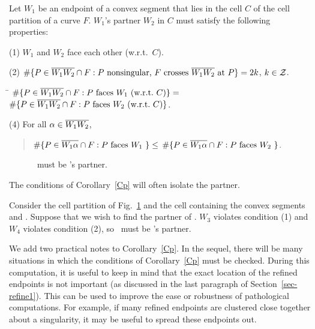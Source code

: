 \begin{corollary}
\label{Cp}
Let $W_{1}$ be an endpoint of a convex segment that lies in the cell $C$ 
of the cell partition of a curve $F$.
$W_{1}$'s partner $W_{2}$ in $C$ must satisfy the following properties:

{\rm (1)} $W_{1}$ and $W_{2}$ face each other {\rm (}w.r.t.\ $C${\rm )}.

{\rm (2)} $\#\{P \in \mbox{$\overline{W_{1}W_{2}}$} \cap F: P \mbox{ nonsingular,
	$F$ crosses } \mbox{$\overline{\mbox{$W_{1}$}\mbox{$W_{2}$}}$} \mbox{ at } P\} = 2k$, $k \in {\cal Z}$.

\begin{tabbing}
 \= $\#\{P \in \seg{W_{1}W_{2}} \cap F: P \mbox{ faces \wo\ 
	{\rm (}w.r.t.\ $C${\rm )}}\} = $\\
\> $\#\{P \in \mbox{$\overline{W_{1}W_{2}}$} \cap F: P \mbox{ faces \mbox{$W_{2}$}\ {\rm (}w.r.t.\ $C${\rm )}}\}$.
\end{tabbing}

{\rm (4)} For all $\alpha \in \mbox{$\overline{\mbox{$W_{1}$}\mbox{$W_{2}$}}$}$,\ \ \nopagebreak
\begin{quote}
	$\#\{P \in\mbox{$\overline{\mbox{$W_{1}$}\alpha}$}\cap F: P \mbox{ faces \mbox{$W_{1}$}\ }\} \leq $
	$\#\{P \in\mbox{$\overline{\mbox{$W_{1}$}\alpha}$}\cap F: P \mbox{ faces \mbox{$W_{2}$}\ }\}$.
\end{quote}
\end{corollary}

\begin{figure}[htbp]\vspace{2.25in}\caption{\wt\ must be \wo's partner.}
\label{3.12}\end{figure}

\noindent The conditions of Corollary~\ref{Cp} will often isolate the partner.

\begin{example}
{\rm 
Consider the cell partition of Fig.~\ref{3.12} and the cell containing
the convex segments \arc{\wo\wt} and \arc{W_{3}W_{4}}.
Suppose that we wish to find the partner of \wo.
$W_{3}$ violates condition (1) and $W_{4}$ violates condition (2), 
so \wt\ must be \wo's partner.
}
\end{example}

We add two practical notes to Corollary~\ref{Cp}.
In the sequel,
there will be many situations in which the conditions of Corollary~\ref{Cp}
must be checked.
During this computation, it is useful to keep in mind that the exact location of the
refined endpoints is not important (as discussed in the last paragraph of
Section~\ref{sec-refine1}).
This can be used to improve the ease or robustness of pathological computations.
For example, if many refined endpoints are clustered close together about a singularity,
it may be useful to spread these endpoints out.

